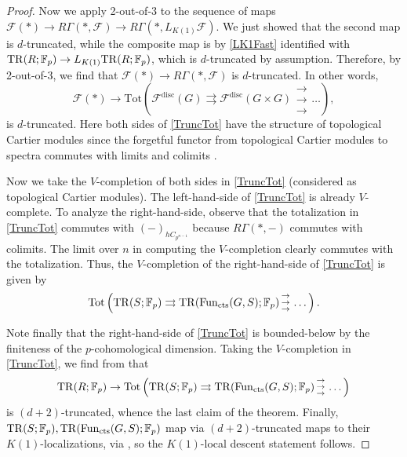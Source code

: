 \documentclass{amsart}
\newcommand{\triplearrows}{\begin{smallmatrix} \to \\ \to \\ 
\to \end{smallmatrix} }
\newcommand{\sF}{\mathcal{F}}
\theoremstyle{definition}
\begin{document}
\begin{proof}
Now we 
apply 2-out-of-3 to the sequence of maps $\sF(\ast) \to R \Gamma(\ast, \sF)
\to R \Gamma(\ast, L_{K(1)} \sF)$.
We just showed that the second map is $d$-truncated, while the composite map is 
by \eqref{LK1Fast} identified with $\mathrm{TR}(R; \mathbb{F}_p) \to L_{K(1)} \mathrm{TR}(R;
\mathbb{F}_p)$, which is $d$-truncated by assumption. 
Therefore, by 2-out-of-3, 
we find that $\sF(\ast) \to R \Gamma(\ast, \sF)$
is $d$-truncated. 
In other words,
\begin{equation} \label{TruncTot} \sF(\ast) \to \mathrm{Tot}( \sF^{\mathrm{disc}}(G) \rightrightarrows
\sF^{\mathrm{disc}}(G \times G)
\triplearrows \dots ) , \end{equation}
is $d$-truncated. 
Here both sides of \eqref{TruncTot} have the structure of topological Cartier
modules since the
forgetful functor from topological Cartier modules to spectra commutes with
limits and colimits \cite[Prop.~3.11]{AN}. 

Now we take the $V$-completion of both sides in \eqref{TruncTot} (considered as
topological Cartier modules). 
The left-hand-side 
of \eqref{TruncTot}
is already $V$-complete. 
To analyze the right-hand-side, observe that 
the totalization in \eqref{TruncTot} commutes with $(-)_{hC_{p^{n-1}}}$ because
$R\Gamma( \ast, -)$ commutes with colimits. 
The limit over $n$ in computing the $V$-completion clearly commutes with
the totalization. Thus, the $V$-completion of the right-hand-side of
\eqref{TruncTot} is given by 
$$\mathrm{Tot}\left( \TR(S; \mathbb{F}_p) \rightrightarrows \TR(
\mathrm{Fun}_{\mathrm{cts}}(G, S); \mathbb{F}_p) \triplearrows \dots \right).$$

Note finally that the right-hand-side of \eqref{TruncTot} is bounded-below by
the finiteness of the $p$-cohomological dimension. 
Taking the $V$-completion in \eqref{TruncTot}, we find from  that 
\[ \TR(R; \mathbb{F}_p) \to \mathrm{Tot}\left( \TR(S; \mathbb{F}_p) \rightrightarrows \TR(
\mathrm{Fun}_{\mathrm{cts}}(G, S); \mathbb{F}_p) \triplearrows \dots \right)  \]
is $(d+2)$-truncated, whence the last claim of the theorem. 
Finally, $\mathrm{TR}(S; \mathbb{F}_p), \mathrm{TR}( \mathrm{Fun}_{\mathrm{cts}}(G, S);
\mathbb{F}_p)$ map via $(d+2)$-truncated maps to their $K(1)$-localizations,
via , so the $K(1)$-local descent statement follows. 
\end{proof} 
\end{document}
